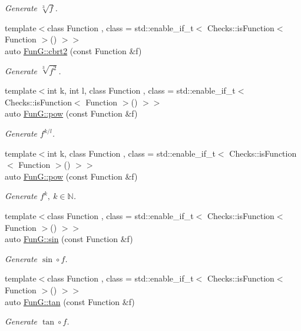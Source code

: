 \begin{DoxyCompactItemize}
\begin{DoxyCompactList}\small\item\em Generate $ \sqrt[3]{f} $. \end{DoxyCompactList}\item 
{\footnotesize template$<$class Function , class  = std\+::enable\+\_\+if\+\_\+t$<$ Checks\+::is\+Function$<$ Function $>$() $>$$>$ }\\auto \hyperlink{group__CMathGroup_gafd27322fb64c6df3366f384c93819a06}{Fun\+G\+::cbrt2} (const Function \&f)
\begin{DoxyCompactList}\small\item\em Generate $ \sqrt[3]{f^2}$. \end{DoxyCompactList}\item 
{\footnotesize template$<$int k, int l, class Function , class  = std\+::enable\+\_\+if\+\_\+t$<$ Checks\+::is\+Function$<$ Function $>$() $>$$>$ }\\auto \hyperlink{group__CMathGroup_gaecae6fa60bbfc0eb1867581ee4577d4e}{Fun\+G\+::pow} (const Function \&f)
\begin{DoxyCompactList}\small\item\em Generate $ f^{k/l} $. \end{DoxyCompactList}\item 
{\footnotesize template$<$int k, class Function , class  = std\+::enable\+\_\+if\+\_\+t$<$ Checks\+::is\+Function$<$ Function $>$() $>$$>$ }\\auto \hyperlink{group__CMathGroup_gab52ffe2efd379aad7ea322de46103465}{Fun\+G\+::pow} (const Function \&f)
\begin{DoxyCompactList}\small\item\em Generate $ f^k,\ k\in\mathbb{N}$. \end{DoxyCompactList}\item 
{\footnotesize template$<$class Function , class  = std\+::enable\+\_\+if\+\_\+t$<$ Checks\+::is\+Function$<$ Function $>$() $>$$>$ }\\auto \hyperlink{group__CMathGroup_ga663fdbe7a8977cba529c7c33981b7738}{Fun\+G\+::sin} (const Function \&f)
\begin{DoxyCompactList}\small\item\em Generate $ \sin\circ f $. \end{DoxyCompactList}\item 
{\footnotesize template$<$class Function , class  = std\+::enable\+\_\+if\+\_\+t$<$ Checks\+::is\+Function$<$ Function $>$() $>$$>$ }\\auto \hyperlink{group__CMathGroup_gae03f57bd4efb4449ad1dc60cb74c742d}{Fun\+G\+::tan} (const Function \&f)
\begin{DoxyCompactList}\small\item\em Generate $ \tan\circ f $. \end{DoxyCompactList}\end{DoxyCompactItemize}



